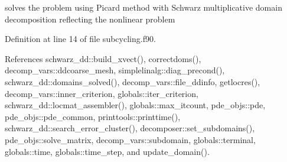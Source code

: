 solves the problem using Picard method with Schwarz multiplicative domain decomposition reflecting the nonlinear problem 



Definition at line 14 of file subcycling.\+f90.



References schwarz\+\_\+dd\+::build\+\_\+xvect(), correctdoms(), decomp\+\_\+vars\+::ddcoarse\+\_\+mesh, simplelinalg\+::diag\+\_\+precond(), schwarz\+\_\+dd\+::domains\+\_\+solved(), decomp\+\_\+vars\+::file\+\_\+ddinfo, getlocres(), decomp\+\_\+vars\+::inner\+\_\+criterion, globals\+::iter\+\_\+criterion, schwarz\+\_\+dd\+::locmat\+\_\+assembler(), globals\+::max\+\_\+itcount, pde\+\_\+objs\+::pde, pde\+\_\+objs\+::pde\+\_\+common, printtools\+::printtime(), schwarz\+\_\+dd\+::search\+\_\+error\+\_\+cluster(), decomposer\+::set\+\_\+subdomains(), pde\+\_\+objs\+::solve\+\_\+matrix, decomp\+\_\+vars\+::subdomain, globals\+::terminal, globals\+::time, globals\+::time\+\_\+step, and update\+\_\+domain().


